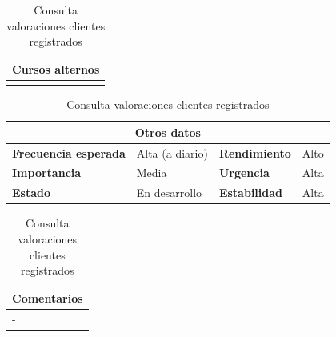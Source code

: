 \documentclass[12pt,spanish]{article}
\begin{document}
\begin{table}[H]
\vspace{1cm}

\begin{tabular}{|m{10pt}|m{7.15cm}|m{10pt}|m{7.15cm}|}
\hline
\multicolumn{4}{|m{16.2cm}|}{\textbf{Cursos alternos}} \\
\hline
\\
\hline
\end{tabular}

\vspace{1cm}

\begin{tabular}{|m{3.72cm}|m{3.72cm}|m{3.72cm}|m{3.72cm}|}
\hline
\multicolumn{4}{|c|}{\textbf{Otros datos}} \\
\hline
\textbf{Frecuencia esperada} & Alta (a diario) & \textbf{Rendimiento} & Alto \\
\hline
\textbf{Importancia} & Media & \textbf{Urgencia} & Alta \\
\hline
\textbf{Estado} & En desarrollo & \textbf{Estabilidad} & Alta \\
\hline
\end{tabular}

\vspace{1cm}

\begin{tabular}{|m{16.2cm}|}
\hline
\textbf{Comentarios} \\
\hline
- \\
\hline
\end{tabular}

\caption{Consulta valoraciones clientes registrados}

\end{table}

\end{document}

